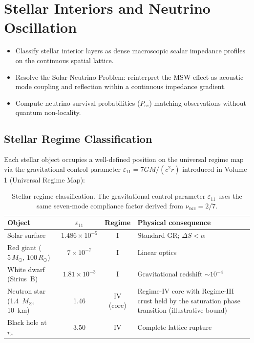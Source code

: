 
\chapter{Stellar Interiors and Neutrino Oscillation}
\label{ch:stellar}


\begin{objectivebox}
\begin{itemize}
    \item Classify stellar interior layers as dense macroscopic scalar impedance profiles on the continuous spatial lattice.
    \item Resolve the Solar Neutrino Problem: reinterpret the MSW effect as acoustic mode coupling and reflection within a continuous impedance gradient.
    \item Compute neutrino survival probabilities ($P_{ee}$) matching observations without quantum non-locality.
\end{itemize}
\end{objectivebox}

\section{Stellar Regime Classification}
\label{sec:stellar_regimes}

Each stellar object occupies a well-defined position on the universal regime map via the gravitational control parameter $\varepsilon_{11} = 7GM/(c^2 r)$ introduced in Volume 1 (Universal Regime Map):

\begin{table}[H]
\centering\small
\caption{Stellar regime classification.  The gravitational control parameter $\varepsilon_{11}$ uses the same seven-mode compliance factor derived from $\nu_{vac} = 2/7$.}
\label{tab:stellar_regimes}
\begin{tabularx}{\textwidth}{@{}lccX@{}}
\toprule
\textbf{Object} & $\varepsilon_{11}$ & \textbf{Regime} & \textbf{Physical consequence} \\
\midrule
Solar surface              & $1.486 \times 10^{-5}$ & I  & Standard GR; $\Delta S < \alpha$ \\
Red giant ($5\,M_\odot$, $100\,R_\odot$) & $7 \times 10^{-7}$ & I  & Linear optics \\
White dwarf (Sirius~B)     & $1.81 \times 10^{-3}$ & I  & Gravitational redshift $\sim 10^{-4}$ \\
Neutron star (1.4~$M_\odot$, 10~km) & 1.46     & IV (core) & Regime-IV core with Regime-III crust held by the saturation phase transition (illustrative bound) \\
Black hole at $r_s$        & 3.50                  & IV & Complete lattice rupture \\
\bottomrule
\end{tabularx}
\end{table}

